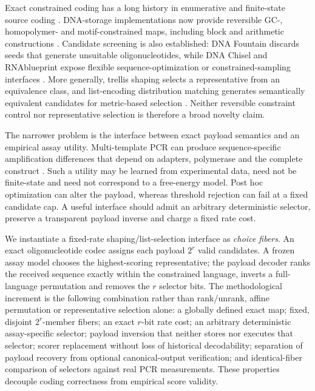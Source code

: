 \documentclass[unnumsec,webpdf,modern,large]{oup-authoring-template}
\begin{document}
Exact constrained coding has a long history in enumerative and finite-state source coding \cite{cover1973enumerative,adler1983slidingblock}. DNA-storage implementations now provide reversible GC-, homopolymer- and motif-constrained maps, including block and arithmetic constructions \cite{wang2019bioconstrained,immink2019balancedhomopolymer,welzel2023dnaaeon,ruan2026scone}. Candidate screening is also established: DNA Fountain discards seeds that generate unsuitable oligonucleotides, while DNA Chisel and RNAblueprint expose flexible sequence-optimization or constrained-sampling interfaces \cite{erlich2017dnafountain,zulkower2020dnachisel,hammer2017rnablueprint}. More generally, trellis shaping selects a representative from an equivalence class, and list-encoding distribution matching generates semantically equivalent candidates for metric-based selection \cite{forney1992trellisshaping,wu2022listccdm}. Neither reversible constraint control nor representative selection is therefore a broad novelty claim.

The narrower problem is the interface between exact payload semantics and an empirical assay utility. Multi-template PCR can produce sequence-specific amplification differences that depend on adapters, polymerase and the complete construct \cite{gimpel2025pcrbias}. Such a utility may be learned from experimental data, need not be finite-state and need not correspond to a free-energy model. Post hoc optimization can alter the payload, whereas threshold rejection can fail at a fixed candidate cap. A useful interface should admit an arbitrary deterministic selector, preserve a transparent payload inverse and charge a fixed rate cost.

We instantiate a fixed-rate shaping/list-selection interface as \emph{choice fibers}. An exact oligonucleotide codec assigns each payload $2^r$ valid candidates. A frozen assay model chooses the highest-scoring representative; the payload decoder ranks the received sequence exactly within the constrained language, inverts a full-language permutation and removes the $r$ selector bits. The methodological increment is the following combination rather than rank/unrank, affine permutation or representative selection alone: a globally defined exact map; fixed, disjoint $2^r$-member fibers; an exact $r$-bit rate cost; an arbitrary deterministic assay-specific selector; payload inversion that neither stores nor executes that selector; scorer replacement without loss of historical decodability; separation of payload recovery from optional canonical-output verification; and identical-fiber comparison of selectors against real PCR measurements. These properties decouple coding correctness from empirical score validity.
\end{document}
